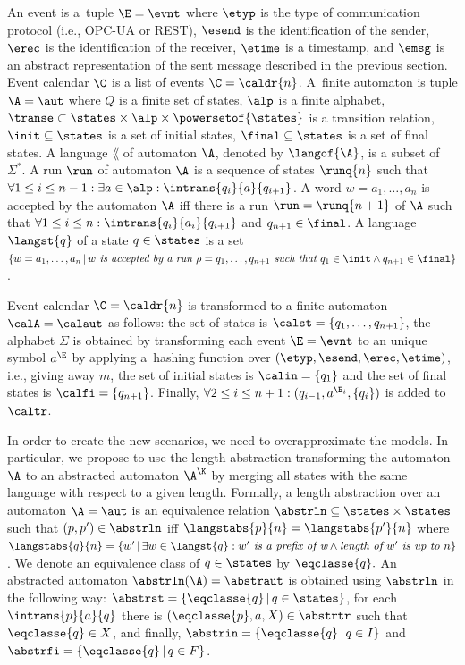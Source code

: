 {An event is a~tuple $\E = \evnt$ where $\etyp$ is the type of
communication protocol (i.e., OPC-UA or REST), $\esend$ is the identification
of the sender, $\erec$ is the identification of the receiver, $\etime$ is a
timestamp, and $\emsg$ is an abstract representation of the sent message described in the previous section.
Event calendar $\C$ is a list of events $\C = \caldr{n}$.
%
A~finite automaton is tuple $\A=\aut$ where $Q$ is a finite set of states,
$\alp$ is a finite alphabet, $\transe \subset \states\times \alp \times
\powersetof{\states}$ is a transition relation, $\init\subseteq \states$ is a
set of initial states, $\final\subseteq \states$ is a set of final states.  A
language $\lang$ of automaton $\A$, denoted by $\langof{\A}$, is a subset of
$\Sigma^*$.  A run $\run$ of automaton $\A$ is a sequence of states $\runq{n}$
such that $\forall 1 \leq i \leq n-1: \exists a\in \alp:
\intrans{q_i}{a}{q_{i+1}}$.  A word $w=a_1,\ldots,a_n$ is accepted by the
automaton $\A$
iff there is a run $\run=\runq{n+1}$ of $\A$ such that $\forall 1 \leq i \leq n:
\intrans{q_i}{a_i}{q_{i+1}}$ and $q_{n+1}\in \final$.  A language $\langst{q}$ of
a state $q\in \states$ is a set $\{w=a_1,\ldots,a_n\,|\, w\emph{ is accepted by
a run }\rho=q_1,\ldots,q_{n+1} \emph{ such that } q_1\in\init \wedge q_{n+1}\in
\final\}$.

Event calendar $\C=\caldr{n}$ is transformed to a finite automaton
$\calA=\calaut$ as follows: the set of states is
$\calst=\{q_1,\ldots,q_{n+1}\}$, the alphabet $\Sigma$ is obtained by
transforming each event $\E=\evnt$ to an unique symbol $a^\E$ by applying
a~hashing function over $(\etyp,\esend,\erec,\etime)$, i.e., giving away $m$,
the set of initial states is $\calin=\{q_1\}$ and the set of final states is
$\calfi=\{q_{n+1}\}$.  Finally, $\forall 2 \leq i \leq n+1:
(q_{i-1},a^{\E_i},\{q_{i}\})$ is added to $\caltr$.  

In order to create the new scenarios, we need to overapproximate the models. In
particular, we propose to use the length abstraction transforming the automaton
$\A$ to an abstracted automaton $\A^\K$ by merging all states with the same
language with respect to a given length.
%
Formally, a length abstraction over an automaton $\A=\aut$ is an equivalence
relation $\abstrln \subseteq \states\times \states$ such that $(p,p')\in
\abstrln$ iff $\langstabs{p}{n}=\langstabs{p'}{n}$ where $\langstabs{q}{n}=\{w'\,|\, \exists w \in \langst{q}: w' \emph{ is a prefix of w} \wedge \emph{length of } w'
\emph{ is up to } n\}$.
We denote an equivalence class of $q\in\states$ by $\eqclasse{q}.$ An abstracted automaton
$\abstrln(\A)=\abstraut$ is obtained using $\abstrln$ in the following way:
$\abstrst=\{\eqclasse{q}\,|\,q\in\states\}$, for each $\intrans{p}{a}{q}$ there
is $(\eqclasse{p}, a, X) \in \abstrtr$ such that $\eqclasse{q}\in X$, and finally,
$\abstrin=\{\eqclasse{q}\,|\,q\in I\}$ and $\abstrfi=\{\eqclasse{q}\,|\,q\in
F\}$.

}
